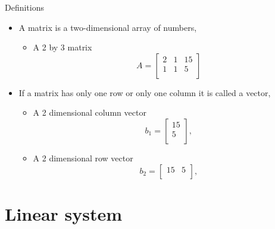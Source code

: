 \documentclass{beamer}
\theoremstyle{definition}
\theoremstyle{theorem}
\begin{document}
\begin{frame}
{Definitions}
\begin{itemize}
 \item A matrix is a two-dimensional array of numbers, 
\begin{itemize}
 \item A 2 by 3 matrix 
 $$ A = 
\begin{bmatrix}
 2 & 1 & 15\\
 1 & 1 & 5\\
 \end{bmatrix}
$$
\end{itemize}
\item If a matrix has only one row or only one column it is called a vector, 
\begin{itemize}
 \item A 2 dimensional column vector 
 $$ b_{1} = 
\begin{bmatrix}
 15 \\
 5  \\
 \end{bmatrix}, 
 $$
\item A 2 dimensional  row vector
 $$  b_{2} = 
 \begin{bmatrix}
 15 &
 5  \\
 \end{bmatrix}, 
 $$
\end{itemize} 
\end{itemize}
\end{frame}

\section{Linear system}
\end{document}
